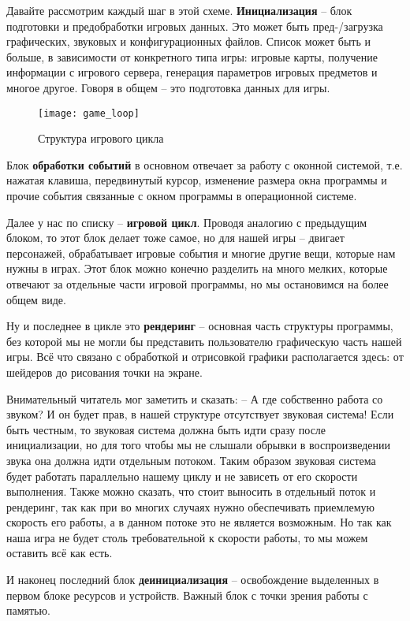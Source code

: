Давайте рассмотрим каждый шаг в этой схеме. \textbf{Инициализация} -- блок подготовки и предобработки 
игровых данных. Это может быть пред-/загрузка графических, звуковых и конфигурационных файлов. Список может 
быть и больше, в зависимости от конкретного типа игры: игровые карты, получение информации с игрового 
сервера, генерация параметров игровых предметов и многое другое. Говоря в общем -- это подготовка данных 
для игры.

\begin{wrapfigure}[18]{r}{0.22\linewidth}
    \texttt{[image: game\_loop]}
    \caption{Структура игрового цикла}
    \label{img:skeleton}
\end{wrapfigure}

Блок \textbf{обработки событий} в основном отвечает за работу с оконной системой, т.е. нажатая клавиша, 
передвинутый курсор, изменение размера окна программы и прочие события связанные с окном программы в 
операционной системе. 

Далее у нас по списку -- \textbf{игровой цикл}. Проводя аналогию с предыдущим блоком, то этот блок делает 
тоже самое, но для нашей игры -- двигает персонажей, обрабатывает игровые события и многие другие вещи, 
которые нам нужны в играх. Этот блок можно конечно разделить на много мелких, которые отвечают за 
отдельные части игровой программы, но мы остановимся на более общем виде. 

Ну и последнее в цикле это \textbf{рендеринг} -- основная часть структуры программы, без которой мы не могли 
бы представить пользователю графическую часть нашей игры. Всё что связано с обработкой и отрисовкой графики 
располагается здесь: от шейдеров до рисования точки на экране.

Внимательный читатель мог заметить и сказать: -- А где собственно работа со звуком? И он будет прав, в нашей 
структуре отсутствует звуковая система! Если быть честным, то звуковая система должна быть идти сразу после 
инициализации, но для того чтобы мы не слышали обрывки в воспроизведении звука она должна идти отдельным 
потоком. Таким образом звуковая система будет работать параллельно нашему циклу и не зависеть от его скорости 
выполнения. Также можно сказать, что стоит выносить в отдельный поток и рендеринг, так как при во многих 
случаях нужно обеспечивать приемлемую скорость его работы, а в данном потоке это не является возможным. 
Но так как наша игра не будет столь требовательной к скорости работы, то мы можем оставить всё как есть.

И наконец последний блок \textbf{деинициализация} -- освобождение выделенных в первом блоке ресурсов и 
устройств. Важный блок с точки зрения работы с памятью.

